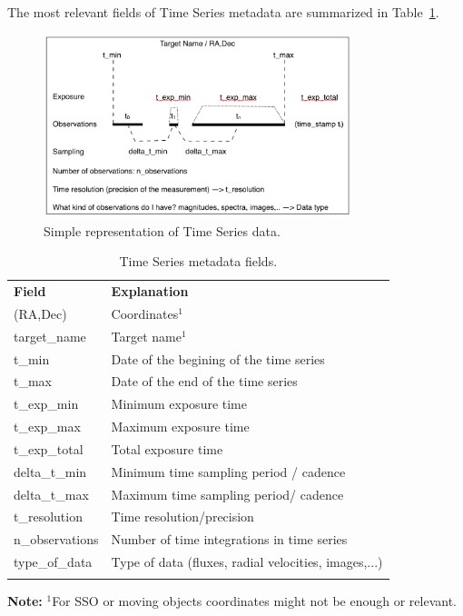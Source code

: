 \documentclass[11pt,a4paper]{ivoa}
\begin{document}
The most relevant fields of Time Series metadata are summarized in Table~\ref{tab:fields}.

\begin{figure}[hbt]

\begin{center}
  \includegraphics[width=0.8\textwidth]{figs/fig1.png}
\caption{Simple representation of Time Series data.} 
\label{fig:time-series}
\end{center}
\end{figure}

\begin{table}[hb] 
  \begin{center}
  \caption{Time Series metadata fields.}
  \label{tab:fields}
    \begin{tabular}{p{}p{}}
      \sptablerule
      \textbf{Field}  & \textbf{Explanation}                        \\\sptablerule
      (RA,Dec)        & Coordinates$^1$                             \\
      target\_name    & Target name$^1$                             \\ 
      t\_min          & Date of the begining of the time series  \\
      t\_max          & Date of the end of the time series          \\
      t\_exp\_min     & Minimum exposure time                       \\
      t\_exp\_max     & Maximum exposure time                       \\
      t\_exp\_total   & Total exposure time                         \\
      delta\_t\_min   & Minimum time sampling period / cadence             \\
      delta\_t\_max   & Maximum time sampling period/ cadence             \\
      t\_resolution   & Time resolution/precision                   \\
      n\_observations & Number of time integrations  in time series         \\
      type\_of\_data  & Type of data (fluxes, radial velocities, images,...)\\
      \sptablerule
    \end{tabular}
  \end{center}
  \textbf{Note:} $^1$For SSO or moving objects coordinates might not be enough or relevant. 
\end{table}
\end{document}
